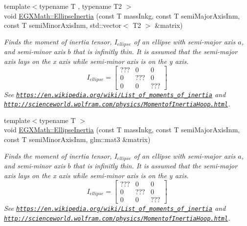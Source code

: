 \begin{DoxyCompactItemize}
{\footnotesize template$<$typename T , typename T2 $>$ }\\void \mbox{\hyperlink{group___e_g_x_math-_geometry-2_d-_ellipse_ga4d9a8fec47d22c25481db36bf475905a}{E\+G\+X\+Math\+::\+Ellipse\+Inertia}} (const T mass\+Inkg, const T semi\+Major\+Axis\+Inm, const T semi\+Minor\+Axis\+Inm, std\+::vector$<$ T2 $>$ \&matrix)
\begin{DoxyCompactList}\small\item\em Finds the moment of inertia tensor, $I_{ellipse}$ of an ellipse with semi-\/major axis $a$, and semi-\/minor axis $b$ that is infinitly thin. It is assumed that the semi-\/major axis lays on the x axis while semi-\/minor axis is on the y axis. \[ I_{ellipse}=\begin{bmatrix} ??? & 0 & 0\\ 0 & ??? & 0\\ 0 & 0 & ??? \end{bmatrix} \] See \href{https://en.wikipedia.org/wiki/List_of_moments_of_inertia}{\tt https\+://en.\+wikipedia.\+org/wiki/\+List\+\_\+of\+\_\+moments\+\_\+of\+\_\+inertia} and \href{http://scienceworld.wolfram.com/physics/MomentofInertiaHoop.html}{\tt http\+://scienceworld.\+wolfram.\+com/physics/\+Momentof\+Inertia\+Hoop.\+html}. \end{DoxyCompactList}\item 
{\footnotesize template$<$typename T $>$ }\\void \mbox{\hyperlink{group___e_g_x_math-_geometry-2_d-_ellipse_gad679a65dc7550e27dc69c1d328c94732}{E\+G\+X\+Math\+::\+Ellipse\+Inertia}} (const T mass\+Inkg, const T semi\+Major\+Axis\+Inm, const T semi\+Minor\+Axis\+Inm, glm\+::mat3 \&matrix)
\begin{DoxyCompactList}\small\item\em Finds the moment of inertia tensor, $I_{ellipse}$ of an ellipse with semi-\/major axis $a$, and semi-\/minor axis $b$ that is infinitly thin. It is assumed that the semi-\/major axis lays on the x axis while semi-\/minor axis is on the y axis. \[ I_{ellipse}=\begin{bmatrix} ??? & 0 & 0\\ 0 & ??? & 0\\ 0 & 0 & ??? \end{bmatrix} \] See \href{https://en.wikipedia.org/wiki/List_of_moments_of_inertia}{\tt https\+://en.\+wikipedia.\+org/wiki/\+List\+\_\+of\+\_\+moments\+\_\+of\+\_\+inertia} and \href{http://scienceworld.wolfram.com/physics/MomentofInertiaHoop.html}{\tt http\+://scienceworld.\+wolfram.\+com/physics/\+Momentof\+Inertia\+Hoop.\+html}. \end{DoxyCompactList}\end{DoxyCompactItemize}


